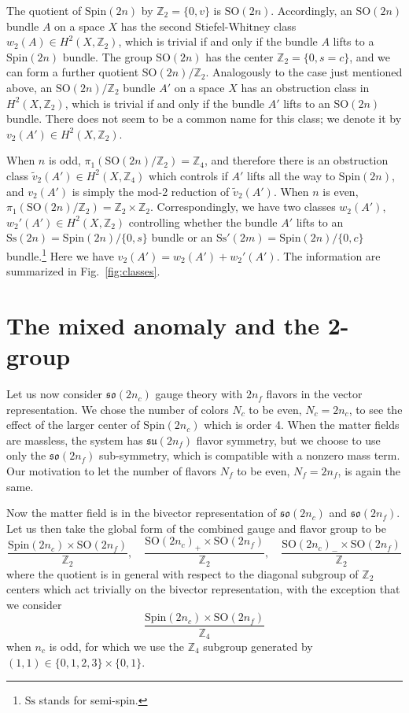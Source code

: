 \documentclass[12pt]{article}
\numberwithin{equation}{section}
\newcommand*{\bZ}{\mathbb{Z}}
\def\SO{\mathrm{SO}}
\def\so{\mathfrak{so}}
\def\Spin{\mathrm{Spin}}
\begin{document}
The quotient of $\Spin(2n)$ by $\bZ_2=\{0,v\}$ is $\SO(2n)$.
Accordingly, an $\SO(2n)$ bundle $A$ on a space $X$ has the second Stiefel-Whitney class $w_2(A)\in H^2(X,\bZ_2)$, which is trivial if and only if the bundle $A$ lifts to a $\Spin(2n)$ bundle.
The group $\SO(2n)$ has the center $\bZ_2=\{0,s=c\}$,
and we can form a further quotient $\SO(2n)/\bZ_2$.
Analogously to the case just mentioned above,
an $\SO(2n)/\bZ_2$ bundle $A'$ on a space $X$ has an obstruction class in $H^2(X,\bZ_2)$, which is trivial if and only if the bundle $A'$ lifts to an $\SO(2n)$ bundle.
There does not seem to be a common name for this class; 
we denote it by $v_2(A')\in H^2(X,\bZ_2)$.

When $n$ is odd, $\pi_1(\SO(2n)/\bZ_2)=\bZ_4$, and therefore
there is an obstruction class $\tilde v_2(A')\in H^2(X,\bZ_4)$ which controls if $A'$ lifts all the way to $\Spin(2n)$,
and $v_2(A')$ is simply the mod-2 reduction of $\tilde v_2(A')$.
When $n$ is even, $\pi_1(\SO(2n)/\bZ_2)=\bZ_2\times \bZ_2$.
Correspondingly, we have two classes $w_2(A')$, $w_2'(A')\in H^2(X,\bZ_2)$
controlling whether the bundle $A'$ lifts to 
an $\mathrm{Ss}(2n)=\Spin(2n)/\{0,s\}$ bundle or  
an $\mathrm{Ss}'(2m)=\Spin(2n)/\{0,c\}$ bundle.\footnote{%
$\mathrm{Ss}$ stands for semi-spin.
}
Here we have  $v_2(A')=w_2(A')+w_2'(A')$.
The information are summarized in Fig.~\ref{fig:classes}.


\section{The mixed anomaly and the 2-group}
\label{sec:unknown}
Let us now consider $\so(2n_c)$ gauge theory with $2n_f$ flavors in the vector representation.
We chose the number of colors $N_c$ to be even, $N_c=2n_c$,
to see the effect of the larger center of $\Spin(2n_c)$ which is order 4.
When the matter fields are massless, the system has $\mathfrak{su}(2n_f)$ flavor symmetry,
but we choose to use only the $\mathfrak{so}(2n_f)$ sub-symmetry, which is compatible with a nonzero mass term.
Our motivation to let the number of flavors $N_f$ to be even, $N_f=2n_f$, is again the same.

Now the matter field is in the bivector representation of $\so(2n_c)$ and $\so(2n_f)$.
Let us then take the global form of the combined gauge and flavor group to be 
\begin{equation}
\frac{\Spin(2n_c)\times \SO(2n_f)}{\bZ_2},\quad
\frac{\SO(2n_c)_+\times \SO(2n_f)}{\bZ_2},\quad
\frac{\SO(2n_c)_-\times \SO(2n_f)}{\bZ_2} 
\label{foo}
\end{equation}
where the quotient is in general with respect to the diagonal subgroup of $\bZ_2$ centers which act trivially on the bivector representation, 
with the exception that we consider \begin{equation}
\frac{\Spin(2n_c)\times \SO(2n_f)}{\bZ_4}
\label{bar}
\end{equation}
when $n_c$  is odd, for which we use the $\bZ_4$ subgroup generated by $(1,1) \in \{0,1,2,3\}\times \{0,1\}$.
\end{document}
